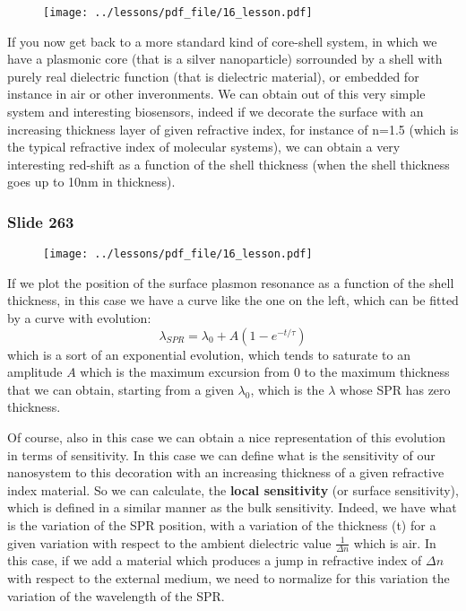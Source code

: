 \documentclass[../main/main.tex]{subfiles}
\begin{document}
\begin{figure}[h!]
\centering
\texttt{[image: ../lessons/pdf\_file/16\_lesson.pdf]}
\end{figure}

If you now get back to a more standard kind of core-shell system, in which we have a plasmonic core (that is a silver nanoparticle) sorrounded by a shell with purely real dielectric function (that is dielectric material), or embedded for instance in air or other inveronments. We can obtain out of this very simple system and interesting biosensors, indeed if we decorate the surface with an increasing thickness layer of given refractive index, for instance of n=1.5 (which is the typical refractive index of molecular systems), we can obtain a very interesting red-shift as a function of the shell thickness (when the shell thickness goes up to 10nm in thickness).


\newpage

\subsubsection{Slide 263}

\begin{figure}[h!]
\centering
\texttt{[image: ../lessons/pdf\_file/16\_lesson.pdf]}
\end{figure}

If we plot the position of the surface plasmon resonance as a function of the shell thickness, in this case we have a curve like the one on the left, which can be fitted by a curve with evolution:
\begin{equation*}
  \lambda _{SPR} = \lambda _0 + A(1- e^{-t/\tau } )
\end{equation*}
which is a sort of an exponential evolution, which tends to saturate to an amplitude \( A \) which is the maximum excursion from 0 to the maximum thickness that we can obtain, starting from a given \( \lambda _0 \), which is the \( \lambda  \) whose SPR has zero thickness.

Of course, also in this case we can obtain a nice representation of this evolution in terms of sensitivity. In this case we can define what is the sensitivity of our nanosystem to this decoration with an increasing thickness of a given refractive index material.
So we can calculate, the \textbf{local sensitivity} (or surface sensitivity), which is defined in a similar manner as the bulk sensitivity. Indeed, we have what is the variation of the SPR position, with a variation of the thickness (t) for a given variation with respect to the ambient dielectric value \( \frac{1}{\Delta n} \) which is air. In this case, if we add a material which produces a jump in refractive index of \( \Delta n \) with respect to the external medium, we need to normalize for this variation the variation of the wavelength of the SPR.
\end{document}
